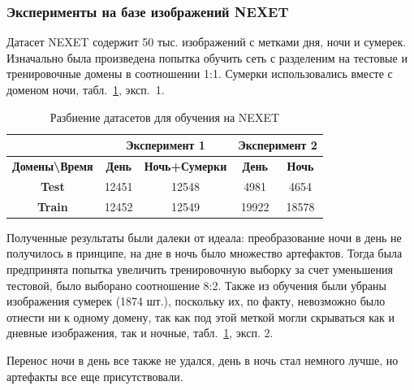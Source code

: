 \documentclass[11pt,a4paper]{extarticle}
\begin{document}
{			\subsubsection*{Эксперименты на базе изображений NEXET}\label{sec:tests:nexet}
				Датасет NEXET \cite{data:nexet} содержит 50 тыс. изображений с метками дня, ночи и сумерек.
				Изначально была произведена попытка обучить сеть с разделеним на тестовые и тренировочные домены в соотношении 1:1.
				Сумерки использовались вместе с доменом ночи, табл.~\ref{tab:tests:nexet}, эксп.~1.
				\begin{table}[ht]
					\centering
					\begin{tabular}{|c|c|c|c|c|}
					\hline
					\rowcolor[HTML]{EFEFEF} 
					\multicolumn{1}{|l|}{\cellcolor[HTML]{EFEFEF}} & \multicolumn{2}{c|}{\cellcolor[HTML]{EFEFEF}\textbf{Эксперимент 1}} & \multicolumn{2}{c|}{\cellcolor[HTML]{EFEFEF}\textbf{Эксперимент 2}} \\ \hline
					\rowcolor[HTML]{EFEFEF} 
					\textbf{Домены\textbackslash{}Время}           & \textbf{День}                & \textbf{Ночь+Сумерки}                & \textbf{День}                    & \textbf{Ночь}                    \\ \hline
					\cellcolor[HTML]{EFEFEF}\textbf{Test}          & 12451                        & 12548                                & 4981                             & 4654                             \\ \hline
					\cellcolor[HTML]{EFEFEF}\textbf{Train}         & 12452                        & 12549                                & 19922                            & 18578                            \\ \hline
					\end{tabular}
					\caption{Разбиение датасетов для обучения на NEXET}
					\label{tab:tests:nexet}
				\end{table}

				\noindent
				Полученные результаты были далеки от идеала: преобразование ночи в день не получилось в принципе, на дне в ночь было множество артефактов.
				Тогда была предпринята попытка увеличить тренировочную выборку за счет уменьшения тестовой, было выборано соотношение 8:2. 
				Также из обучения были убраны изображения сумерек (1874 шт.), поскольку их, по факту, невозможно было отнести ни к одному домену, так как под этой меткой могли скрываться как и дневные изображения, так и ночные, табл.~\ref{tab:tests:nexet}, эксп. 2.  
				
				Перенос ночи в день все также не удался, день в ночь стал немного лучше, но артефакты все еще присутствовали.

}
\end{document}
